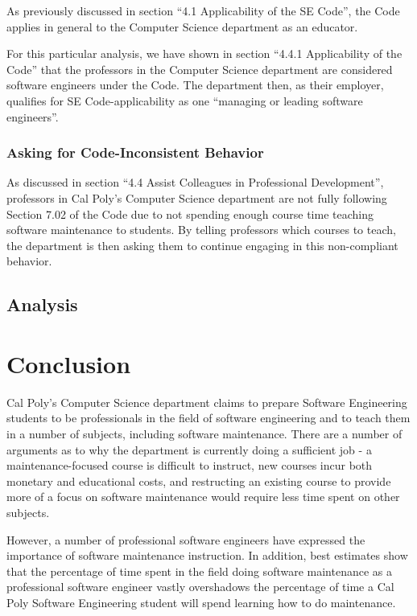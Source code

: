 \documentclass[11pt]{article}
\begin{document}
\begin{multicols}{2}
As previously discussed in section ``4.1 Applicability of the SE Code'', the Code applies in general to the Computer Science department as an educator.

For this particular analysis, we have shown in section ``4.4.1 Applicability of the Code'' that the professors in the Computer Science department are considered software engineers under the Code.  The department then, as their employer, qualifies for SE Code-applicability as one ``managing or leading software engineers''. \cite{secode}

\subsubsection{Asking for Code-Inconsistent Behavior}

As discussed in section ``4.4 Assist Colleagues in Professional Development'', professors in Cal Poly's Computer Science department are not fully following Section 7.02 of the Code due to not spending enough course time teaching software maintenance to students.  By telling professors which courses to teach, the department is then asking them to continue engaging in this non-compliant behavior.

\subsection{Analysis}


\section{Conclusion}

Cal Poly's Computer Science department claims to prepare Software Engineering students to be professionals in the field of software engineering and to teach them in a number of subjects, including software maintenance. \cite{catalogDept}  There are a number of arguments as to why the department is currently doing a sufficient job - a maintenance-focused course is difficult to instruct, new courses incur both monetary and educational costs, and restructing an existing course to provide more of a focus on software maintenance would require less time spent on other subjects.

However, a number of professional software engineers have expressed the importance of software maintenance instruction.  In addition, best estimates show that the percentage of time spent in the field doing software maintenance as a professional software engineer vastly overshadows the percentage of time a Cal Poly Software Engineering student will spend learning how to do maintenance.


\end{multicols}
\end{document}
